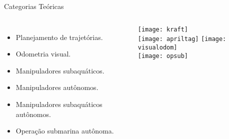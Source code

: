 \begin{frame}[c]{Categorias Teóricas}
    \centering
    \begin{columns}
        \begin{itemize}
            \item Planejamento de trajetórias.
            \item Odometria visual.
            \item Manipuladores subaquáticos.
            \item Manipuladores autônomos.
            \item Manipuladores subaquáticos autônomos.
            \item Operação submarina autônoma.
        \end{itemize}
            \centering
            \texttt{[image: kraft]}\\
            \texttt{[image: apriltag]}
            \centering
            \texttt{[image: visualodom]}\\
            \texttt{[image: opsub]}


\end{columns}
\end{frame}
